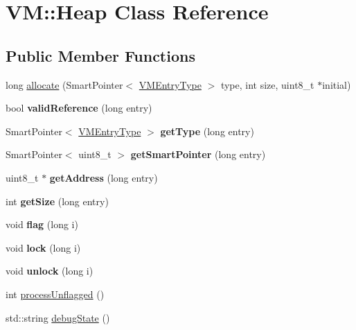 \hypertarget{class_v_m_1_1_heap}{\section{V\-M\-:\-:Heap Class Reference}
\label{class_v_m_1_1_heap}
}
\subsection*{Public Member Functions}
\begin{DoxyCompactItemize}
\item 
long \hyperlink{class_v_m_1_1_heap_ad4af8cf1e9b1b4801b03d94cb5344ee0}{allocate} (Smart\-Pointer$<$ \hyperlink{class_v_m_1_1_v_m_entry_type}{V\-M\-Entry\-Type} $>$ type, int size, uint8\-\_\-t $\ast$initial)
\item 
\hypertarget{class_v_m_1_1_heap_a55b3e734c3437a02620684466aa5bc8a}{bool {\bfseries valid\-Reference} (long entry)}\label{class_v_m_1_1_heap_a55b3e734c3437a02620684466aa5bc8a}

\item 
\hypertarget{class_v_m_1_1_heap_ac0fc2201e52d83ce9d1a3f69528f2954}{Smart\-Pointer$<$ \hyperlink{class_v_m_1_1_v_m_entry_type}{V\-M\-Entry\-Type} $>$ {\bfseries get\-Type} (long entry)}\label{class_v_m_1_1_heap_ac0fc2201e52d83ce9d1a3f69528f2954}

\item 
\hypertarget{class_v_m_1_1_heap_afd540e904508b10ce3a1e547386622c0}{Smart\-Pointer$<$ uint8\-\_\-t $>$ {\bfseries get\-Smart\-Pointer} (long entry)}\label{class_v_m_1_1_heap_afd540e904508b10ce3a1e547386622c0}

\item 
\hypertarget{class_v_m_1_1_heap_a111c75b74ccab7b481ec4c578a8a8cd1}{uint8\-\_\-t $\ast$ {\bfseries get\-Address} (long entry)}\label{class_v_m_1_1_heap_a111c75b74ccab7b481ec4c578a8a8cd1}

\item 
\hypertarget{class_v_m_1_1_heap_a1bf0adf9ed907280cfa1ac07a008da46}{int {\bfseries get\-Size} (long entry)}\label{class_v_m_1_1_heap_a1bf0adf9ed907280cfa1ac07a008da46}

\item 
\hypertarget{class_v_m_1_1_heap_aa816ee55074c8943b8c7055efd0bb271}{void {\bfseries flag} (long i)}\label{class_v_m_1_1_heap_aa816ee55074c8943b8c7055efd0bb271}

\item 
\hypertarget{class_v_m_1_1_heap_a9ff0e85c497091139634a9c38d46fb72}{void {\bfseries lock} (long i)}\label{class_v_m_1_1_heap_a9ff0e85c497091139634a9c38d46fb72}

\item 
\hypertarget{class_v_m_1_1_heap_a0be6cc847754a25dacddb87784e9196b}{void {\bfseries unlock} (long i)}\label{class_v_m_1_1_heap_a0be6cc847754a25dacddb87784e9196b}

\item 
int \hyperlink{class_v_m_1_1_heap_ace7f82504bd848493b74eefde4489c7c}{process\-Unflagged} ()
\item 
std\-::string \hyperlink{class_v_m_1_1_heap_ace8a1c5e19d042f27f3b1754674c06fa}{debug\-State} ()
\end{DoxyCompactItemize}


